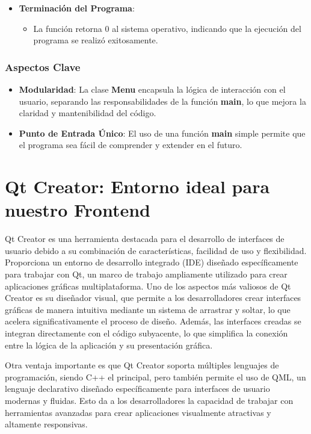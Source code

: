 \documentclass[12pt]{article}
\begin{document}
\begin{flushleft}
\begin{itemize}[left=4em]
                \item \textbf{Terminación del Programa}:
                \begin{itemize}
                    \item La función retorna 0 al sistema operativo, indicando que la ejecución del programa se realizó exitosamente.
                \end{itemize}
            \end{itemize}
        
        \subsubsection{Aspectos Clave}
        
            \begin{itemize}[left=4em]
                \item \textbf{Modularidad}: La clase \textbf{Menu} encapsula la lógica de interacción con el usuario, separando las responsabilidades de la función \textbf{main}, lo que mejora la claridad y mantenibilidad del código.
                \item \textbf{Punto de Entrada Único}: El uso de una función \textbf{main} simple permite que el programa sea fácil de comprender y extender en el futuro.
            \end{itemize}
                
        \section{Qt Creator: Entorno ideal para nuestro Frontend}
        \noindent\hspace*{4em}Qt Creator es una herramienta destacada para el desarrollo de interfaces de usuario debido a su combinación de características, facilidad de uso y flexibilidad. Proporciona un entorno de desarrollo integrado (IDE) diseñado específicamente para trabajar con Qt, un marco de trabajo ampliamente utilizado para crear aplicaciones gráficas multiplataforma. Uno de los aspectos más valiosos de Qt Creator es su diseñador visual, que permite a los desarrolladores crear interfaces gráficas de manera intuitiva mediante un sistema de arrastrar y soltar, lo que acelera significativamente el proceso de diseño. Además, las interfaces creadas se integran directamente con el código subyacente, lo que simplifica la conexión entre la lógica de la aplicación y su presentación gráfica.

        \noindent\hspace*{4em}Otra ventaja importante es que Qt Creator soporta múltiples lenguajes de programación, siendo C++ el principal, pero también permite el uso de QML, un lenguaje declarativo diseñado específicamente para interfaces de usuario modernas y fluidas. Esto da a los desarrolladores la capacidad de trabajar con herramientas avanzadas para crear aplicaciones visualmente atractivas y altamente responsivas.


\end{flushleft}
\end{document}
